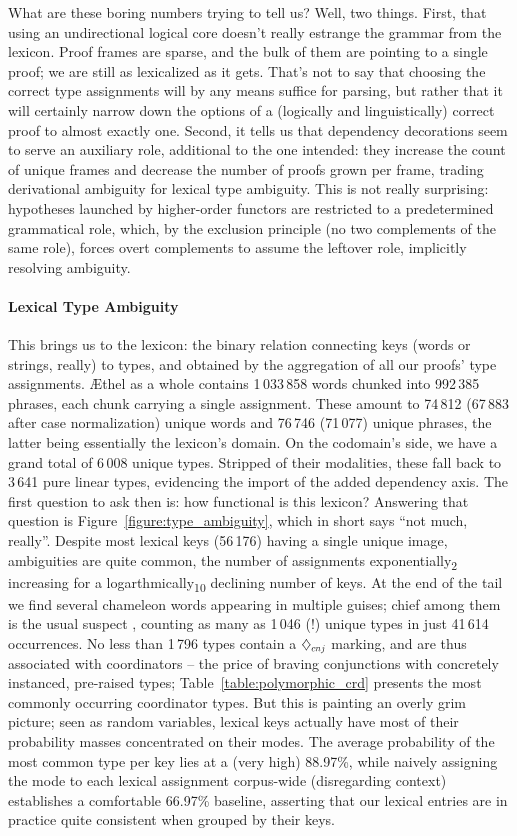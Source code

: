 What are these boring numbers trying to tell us?
Well, two things.
First, that using an undirectional logical core doesn't really estrange the grammar from the lexicon.
Proof frames are sparse, and the bulk of them are pointing to a single proof; we are still as lexicalized as it gets.
That's not to say that choosing the correct type assignments will by any means suffice for parsing, but rather that it will certainly narrow down the options of a (logically and linguistically) correct proof to almost exactly one.
Second, it tells us that dependency decorations seem to serve an auxiliary role, additional to the one intended: they increase the count of unique frames and decrease the number of proofs grown per frame, trading derivational ambiguity for lexical type ambiguity.
This is not really surprising: hypotheses launched by higher-order functors are restricted to a predetermined grammatical role, which, by the exclusion principle (no two complements of the same role), forces overt complements to assume the leftover role, implicitly resolving ambiguity.
\goodbreak


\paragraph{Lexical Type Ambiguity}
This brings us to the lexicon: the binary relation connecting keys (words or strings, really) to types, and obtained by the aggregation of all our proofs' type assignments.
\AE thel as a whole contains 1\,033\,858 words chunked into 992\,385 phrases, each chunk carrying a single assignment.
These amount to  74\,812 (67\,883 after case normalization) unique words and 76\,746 (71\,077) unique phrases, the latter being essentially the lexicon's domain.
On the codomain's side, we have a grand total of 6\,008 unique \NLPplus{} types.
Stripped of their modalities, these fall back to 3\,641 pure linear types, evidencing the import of the added dependency axis.
The first question to ask then is: how functional is this lexicon?
Answering that question is Figure~\ref{figure:type_ambiguity}, which in short says ``not much, really''.
Despite most lexical keys (56\,176) having a single unique image, ambiguities are quite common, the number of assignments exponentially\textsubscript{2} increasing for a logarthmically\textsubscript{10} declining number of keys.
At the end of the tail we find several chameleon words appearing in multiple guises; chief among them is the usual suspect , counting as many as 1\,046 (!) unique types in just 41\,614 occurrences.
No less than 1\,796 types contain a $\ddia{cnj}$ marking, and are thus associated with coordinators -- the price of braving conjunctions with concretely instanced, pre-raised types; Table~\ref{table:polymorphic_crd} presents the most commonly occurring coordinator types.
But this is painting an overly grim picture; seen as random variables, lexical keys actually have most of their probability masses concentrated on their modes.
The average probability of the most common type per key lies at a (very high) 88.97\%, while naively assigning the mode to each lexical assignment corpus-wide (disregarding context) establishes a comfortable 66.97\% baseline, asserting that our lexical entries are in practice quite consistent when grouped by their keys.


